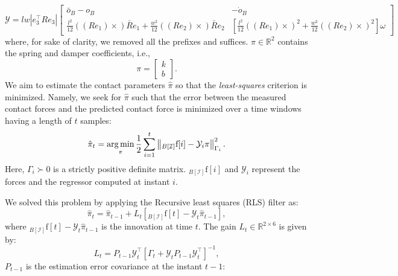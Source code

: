 \begin{equation}
\mathcal{Y} = lw |e _ 3^\top R e _ 3| 
\begin{bmatrix}
\bar{o}_B - o_B & - \dot{o}_B \\
\frac{l^2}{12}\left((R e_1) \times\right) \bar{R} e_1 + \frac{w^2}{12} \left((R e_2) \times\right) \bar{R} e_2 &   \left[\frac{l^2}{12} \left((R e_1) \times\right)^2  + \frac{w^2}{12} \left((R e_2) \times\right) ^2 \right]\omega
\end{bmatrix}
\end{equation}
where, for sake of clarity, we removed all the prefixes and suffices. 
$\pi \in \mathbb{R}^2$ contains the spring and damper coefficients, i.e.,
\begin{equation}
\pi = \begin{bmatrix} k \\ b \end{bmatrix}.
\end{equation}
We aim to estimate the contact parameters $\hat{\pi}$ so that the \emph{least-squares} criterion is minimized. Namely, we seek for $\hat{\pi}$ such that the error between the measured contact forces and the predicted contact force is minimized over a time windows having a length of $t$ samples: 
\begin{equation}
    \label{eq:rls_definition}
    \hat{\pi}_t = \operatorname*{arg\,min}\limits_{\pi} \frac{1}{2} \sum_{i=1}^t\left\lVert{}_{B[\mathcal{I}]} \mathrm{f}[i]- \mathcal{Y}_i \pi\right\rVert^2 _{\Gamma_i}.
\end{equation}
Here, $\Gamma _i \succ 0$ is a strictly positive definite matrix. ${}_{B[\mathcal{I}]} \mathrm{f}[i]$ and $\mathcal{Y}_i$ represent the forces and the regressor computed at instant $i$. 
\par
We solved this problem by applying the Recursive least squares (RLS) filter \citep[Section~11.2]{Ljung1999} as:
\begin{equation}
    \label{eq:contact_param_est}
    \hat{\pi}_t = \hat{\pi}_{t-1} + L_t \left[{}_{B[\mathcal{I}]} \mathrm{f}[t] - \mathcal{Y}_t \hat{\pi}_{t-1}\right],
\end{equation}
where ${}_{B[\mathcal{I}]} \mathrm{f}[t] - \mathcal{Y}_t \hat{\pi}_{t-1}$ is the innovation at time $t$. The gain $L_t \in \mathbb{R}^{2\times6}$ is given by:
\begin{equation}
    \label{eq:kalman}
    L_t = P_{t-1} \mathcal{Y}_t^\top \left[ \Gamma_t + \mathcal{Y}_t P_{t-1} \mathcal{Y}_t^\top\right]^{-1},
\end{equation}
$P_{t-1}$ is the estimation error covariance at the instant $t-1$:
